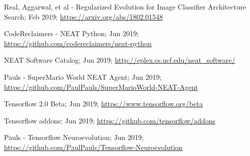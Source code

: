 \documentclass[journal, a4paper]{IEEEtran}
\begin{document}
\begin{thebibliography}{5}
        Real, Aggarwal, et al - Regularized Evolution for Image Classifier Architecture Search; Feb 2019;
        \url{https://arxiv.org/abs/1802.01548}
        
        CodeReclaimers - NEAT Python; Jun 2019;
        \url{https://github.com/codereclaimers/neat-python}
        
        NEAT Software Catalog; Jun 2019;
        \url{http://eplex.cs.ucf.edu/neat_software/}
        
        Pauls - SuperMario World NEAT Agent; Jun 2019;
        \url{https://github.com/PaulPauls/SuperMarioWorld-NEAT-Agent}
        
        Tensorflow 2.0 Beta; Jun 2019;
        \url{https://www.tensorflow.org/beta}
        
        Tensorflow addons; Jun 2019;
        \url{https://github.com/tensorflow/addons}
        
        Pauls - Tensorflow Neuroevolution; Jun 2019;
        \url{https://github.com/PaulPauls/Tensorflow-Neuroevolution}
        
    \end{thebibliography}
\end{document}
